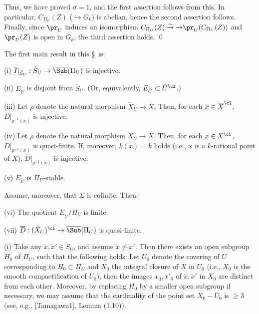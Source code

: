 Thus, we have proved $\sigma=1$, and the first assertion follows from this. 
In particular, $C_{\Pi_U}(Z)$ ($\hookrightarrow G_k$) is abelian, hence 
the second assertion follows. Finally, since $\pr_U$ induces an isomorphism 
$C_{\Pi_U}(Z)\overset{\sim}\to{\to}\pr_U(C_{\Pi_U}(Z))$ and 
$\pr_U(Z)$ is open in $G_k$, the third assertion holds. 
\qed\enddemo

The first main result in this \S\  is: 

 {\rm (i)} 
$\overline{I}|_{{\tilde S}_U}:{\tilde S}_U\to\overline{\Sub}(\Pi_U)$ is injective. 

\noindent
{\rm (ii)} 
$E_{\tilde U}$ is disjoint from ${\tilde S}_U$. 
(Or, equivalently, $E_{\tilde U}\subset {\tilde U}^{\cl}$.)

\noindent
{\rm (iii)} 
Let $\overline \rho$ denote the natural morphism 
${\tilde X}_U\to {\overline X}$. Then, 
for each ${\overline x}\in {\overline X}^{\cl}$, 
$\overline{D}|_{{\overline \rho}^{-1}({\overline x})}$ is injective. 

\noindent
{\rm (iv)} Let $\rho$ denote the natural morphism 
${\tilde X}_U\to X$. Then, 
for each $x\in X^{\cl}$, 
$\overline{D}|_{\rho^{-1}(x)}$ is quasi-finite. 
If, moreover, $k(x)=k$ holds (i.e., $x$ is a $k$-rational 
point of $X$), $\overline{D}|_{\rho^{-1}(x)}$ is injective. 

\noindent
{\rm (v)} $E_{\tilde U}$ is $\Pi_U$-stable. 

Assume, moreover, that $\Sigma$ is cofinite. Then: 

\noindent
{\rm (vi)} The quotient $E_{\tilde U}/\Pi_U$ is finite. 

\noindent
{\rm (vii)} $\overline{D}:({\tilde X}_U)^{\cl}\to\overline{\Sub}(\Pi_U)$ 
is quasi-finite. 
\endproclaim

\noindent
(i) Take any ${\tilde x}, {\tilde x}' \in {\tilde S}_U$, and assume 
${\tilde x}\neq {\tilde x}'$. Then there exists an open subgroup 
$H_0$ of $\Pi_U$, such that the following holds: Let $U_0$ denote the 
covering of $U$ corresponding to $H_0\subset\Pi_U$ 
and $X_0$ the integral closure of $X$ in $U_0$ (i.e., $X_0$ is the smooth 
compactification of $U_0$), then the images $x_0,x'_0$ of 
${\tilde x}, {\tilde x}'$ in $X_0$ are distinct from each other. Moreover, 
by replacing $H_0$ by a smaller open subgroup if necessary, 
we may assume that 
the cardinality of the point set ${\overline X}_0-{\overline U}_0$ is $\geq 3$ 
(see, e.g., [Tamagawa1], Lemma (1.10)). 

